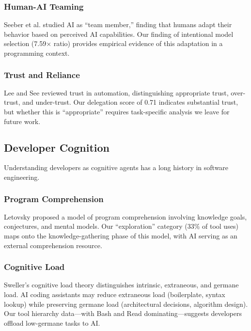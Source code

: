 \documentclass{ntlabs-preprint}
\begin{document}
\subsubsection{Human-AI Teaming}

Seeber et al. \citep{seeber2020machines} studied AI as ``team member,'' finding that humans adapt their behavior based on perceived AI capabilities. Our finding of intentional model selection (7.59$\times$ ratio) provides empirical evidence of this adaptation in a programming context.

\subsubsection{Trust and Reliance}

Lee and See \citep{lee2004trust} reviewed trust in automation, distinguishing appropriate trust, over-trust, and under-trust. Our delegation score of 0.71 indicates substantial trust, but whether this is ``appropriate'' requires task-specific analysis we leave for future work.

\subsection{Developer Cognition}

Understanding developers as cognitive agents has a long history in software engineering.

\subsubsection{Program Comprehension}

Letovsky \citep{letovsky1987cognitive} proposed a model of program comprehension involving knowledge goals, conjectures, and mental models. Our ``exploration'' category (33\% of tool uses) maps onto the knowledge-gathering phase of this model, with AI serving as an external comprehension resource.

\subsubsection{Cognitive Load}

Sweller's cognitive load theory \citep{sweller1988cognitive} distinguishes intrinsic, extraneous, and germane load. AI coding assistants may reduce extraneous load (boilerplate, syntax lookup) while preserving germane load (architectural decisions, algorithm design). Our tool hierarchy data---with Bash and Read dominating---suggests developers offload low-germane tasks to AI.
\end{document}
